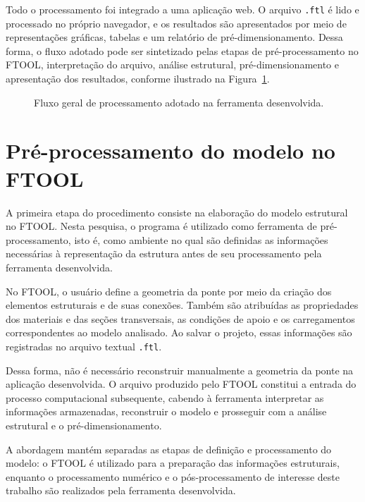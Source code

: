 Todo o processamento foi integrado a uma aplicação web. O arquivo \texttt{.ftl} é lido e processado no próprio navegador, e os resultados são apresentados por meio de representações gráficas, tabelas e um relatório de pré-dimensionamento. Dessa forma, o fluxo adotado pode ser sintetizado pelas etapas de pré-processamento no \acrshort{FTOOL}, interpretação do arquivo, análise estrutural, pré-dimensionamento e apresentação dos resultados, conforme ilustrado na Figura~\ref{fig:fluxo-metodologia}.

\begin{figure}[H]
    \centering
    \caption{Fluxo geral de processamento adotado na ferramenta desenvolvida.}
    
    \label{fig:fluxo-metodologia}
\end{figure}

\section{Pré-processamento do modelo no FTOOL}
\label{sec:metodologia-ftool}

A primeira etapa do procedimento consiste na elaboração do modelo estrutural no \acrshort{FTOOL}. Nesta pesquisa, o programa é utilizado como ferramenta de pré-processamento, isto é, como ambiente no qual são definidas as informações necessárias à representação da estrutura antes de seu processamento pela ferramenta desenvolvida.

No \acrshort{FTOOL}, o usuário define a geometria da ponte por meio da criação dos elementos estruturais e de suas conexões. Também são atribuídas as propriedades dos materiais e das seções transversais, as condições de apoio e os carregamentos correspondentes ao modelo analisado. Ao salvar o projeto, essas informações são registradas no arquivo textual \texttt{.ftl}.

Dessa forma, não é necessário reconstruir manualmente a geometria da ponte na aplicação desenvolvida. O arquivo produzido pelo \acrshort{FTOOL} constitui a entrada do processo computacional subsequente, cabendo à ferramenta interpretar as informações armazenadas, reconstruir o modelo e prosseguir com a análise estrutural e o pré-dimensionamento.

A abordagem mantém separadas as etapas de definição e processamento do modelo: o \acrshort{FTOOL} é utilizado para a preparação das informações estruturais, enquanto o processamento numérico e o pós-processamento de interesse deste trabalho são realizados pela ferramenta desenvolvida.

